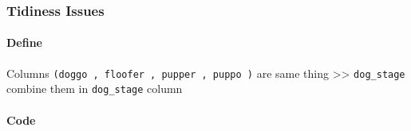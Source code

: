 \documentclass[11pt]{article}
\begin{document}
    \hypertarget{tidiness-issues}{%
\subsubsection{Tidiness Issues}\label{tidiness-issues}}

    \hypertarget{define}{%
\paragraph{Define}\label{define}}

Columns \texttt{(doggo\ ,\ floofer\ ,\ pupper\ ,\ puppo\ )} are same
thing \textgreater\textgreater{} \texttt{dog\_stage} combine them in
\texttt{dog\_stage} column

    \hypertarget{code}{%
\paragraph{Code}\label{code}}
\end{document}
